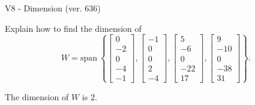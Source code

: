 \begin{exercise}
  \begin{exerciseTitle}V8 - Dimension (ver. 636)\end{exerciseTitle}
  \begin{exerciseStatement}
    Explain how to find the dimension of 
\[W=\mathrm{span}\ \left\{\left[\begin{array}{r}
0 \\
-2 \\
0 \\
-4 \\
-1
\end{array}\right] , \left[\begin{array}{r}
-1 \\
0 \\
0 \\
2 \\
-4
\end{array}\right] , \left[\begin{array}{r}
5 \\
-6 \\
0 \\
-22 \\
17
\end{array}\right] , \left[\begin{array}{r}
9 \\
-10 \\
0 \\
-38 \\
31
\end{array}\right]\right\}.\]



  \end{exerciseStatement}
  \begin{exerciseAnswer}
   The dimension of \(W\) is  \(2\).
  


  \end{exerciseAnswer}
\end{exercise}